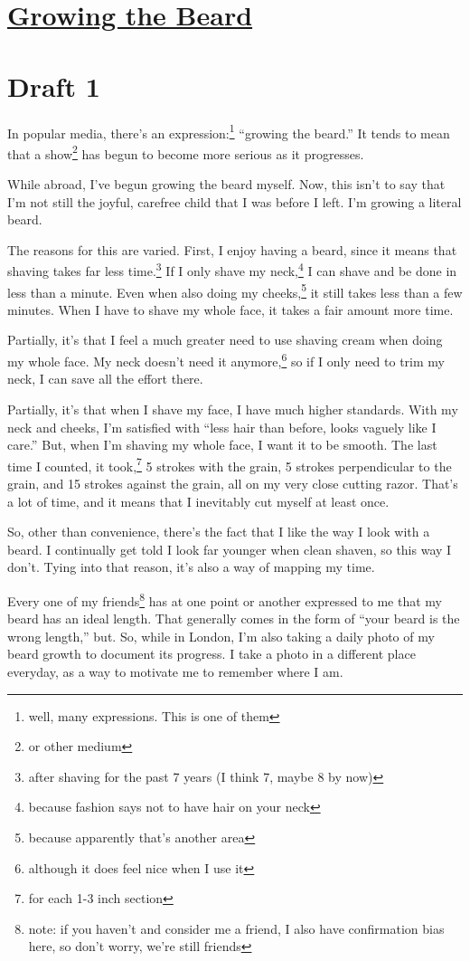 \documentclass[12pt]{article}[titlepage]
\newcommand{\say}[1]{``#1''}
\newcommand{\1}{\={a}}
\newcommand{\2}{\={e}}
\newcommand{\3}{\={\i}}
\newcommand{\4}{\=o}
\newcommand{\5}{\=u}
\newcommand{\6}{\={A}}
\renewcommand{\,}{\textsuperscript{,}}
\begin{document}
\doublespacing
\section{\href{growing-the-beard.html}{Growing the Beard}}
\section{Draft 1}
In popular media, there's an expression:\footnote{well, many expressions. This is one of them} \say{growing the beard.}
It tends to mean that a show\footnote{or other medium} has begun to become more serious as it progresses.

While abroad, I've begun growing the beard myself.
Now, this isn't to say that I'm not still the joyful, carefree child that I was before I left.
I'm growing a literal beard.

The reasons for this are varied.
First, I enjoy having a beard, since it means that shaving takes far less time.\footnote{after shaving for the past 7 years (I think 7, maybe 8 by now)}
If I only shave my neck,\footnote{because fashion says not to have hair on your neck} I can shave and be done in less than a minute.
Even when also doing my cheeks,\footnote{because apparently that's another area} it still takes less than a few minutes.
When I have to shave my whole face, it takes a fair amount more time.

Partially, it's that I feel a much greater need to use shaving cream when doing my whole face.
My neck doesn't need it anymore,\footnote{although it does feel nice when I use it} so if I only need to trim my neck, I can save all the effort there.

Partially, it's that when I shave my face, I have much higher standards.
With my neck and cheeks, I'm satisfied with \say{less hair than before, looks vaguely like I care.}
But, when I'm shaving my whole face, I want it to be smooth.
The last time I counted, it took,\footnote{for each 1-3 inch section} 5 strokes with the grain, 5 strokes perpendicular to the grain, and 15 strokes against the grain, all on my very close cutting razor.
That's a lot of time, and it means that I inevitably cut myself at least once.

So, other than convenience, there's the fact that I like the way I look with a beard.
I continually get told I look far younger when clean shaven, so this way I don't.
Tying into that reason, it's also a way of mapping my time.

Every one of my friends\footnote{note: if you haven't and consider me a friend, I also have confirmation bias here, so don't worry, we're still friends} has at one point or another expressed to me that my beard has an ideal length.
That generally comes in the form of \say{your beard is the wrong length,} but.
So, while in London, I'm also taking a daily photo of my beard growth to document its progress.
I take a photo in a different place everyday, as a way to motivate me to remember where I am.
\end{document}
